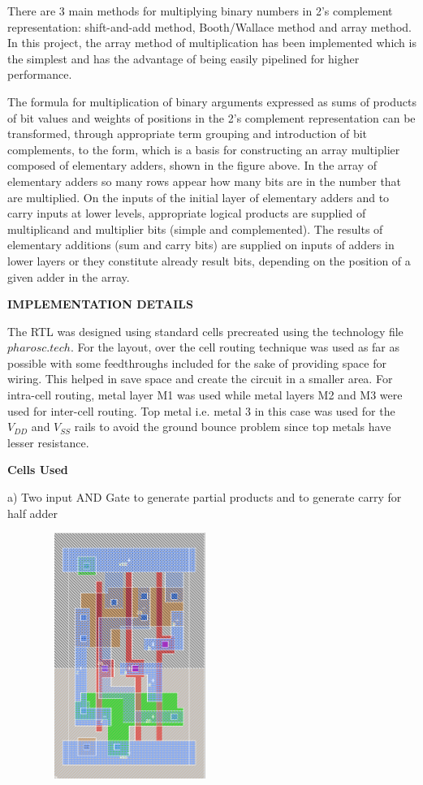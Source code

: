\documentclass[12pt]{report}
\begin{document}
	There are 3 main methods for multiplying binary numbers in 2's complement representation: shift-and-add method, Booth/Wallace method and array method. In this project, the array method of multiplication has been implemented which is the simplest and has the advantage of being easily pipelined for higher performance. \par The formula for multiplication of binary arguments expressed as sums of products of bit values and weights of positions in the 2's complement representation can be transformed, through appropriate term grouping and introduction of bit complements, to the form, which is a basis for constructing an array multiplier composed of elementary adders, shown in the figure above. In the array of elementary adders so many rows appear how many bits are in the number that are multiplied. On the inputs of the initial layer of elementary adders and to carry inputs at lower levels, appropriate logical products are supplied of multiplicand and multiplier bits (simple and complemented). The results of elementary additions (sum and carry bits) are supplied on inputs of adders in lower layers or they constitute already result bits, depending on the position of a given adder in the array.
	\begin{flushleft}
		\begin{Large}
			\textbf{IMPLEMENTATION DETAILS}
		\end{Large}
	\end{flushleft}
The RTL was designed using standard cells precreated using the technology file $pharosc.tech$. For the layout, over the cell routing technique was used as far as possible with some feedthroughs included for the sake of providing space for wiring. This helped in save space and create the circuit in a smaller area. For intra-cell routing, metal layer M1 was used while metal layers M2 and M3 were used for inter-cell routing. Top metal i.e. metal 3 in this case was used for the $V_{DD}$ and $V_{SS}$ rails to avoid the ground bounce problem since top metals have lesser resistance.\\
\vspace{2pt}
\begin{flushleft}
\textbf{Cells Used}
\end{flushleft}
a) Two input AND Gate to generate partial products and to generate carry for half adder
\begin{center}
\includegraphics[height=8cm, width=8cm]{ANDcell}
\end{center}
\end{document}
